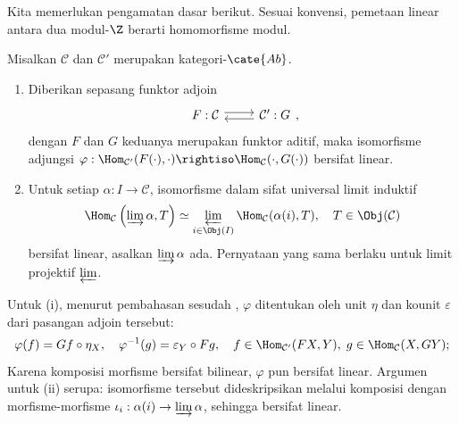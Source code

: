 Kita memerlukan pengamatan dasar berikut. Sesuai konvensi, pemetaan linear
antara dua modul-$\Z$ berarti homomorfisme modul.

\begin{proposisi}\label{prop:automatic-Ab-morphism}
	Misalkan $\mathcal{C}$ dan $\mathcal{C}'$ merupakan kategori-$\cate{Ab}$.
	\begin{enumerate}
		\item Diberikan sepasang funktor adjoin
		\[\begin{tikzcd}
			F: \mathcal{C} \arrow[shift left, r] & \mathcal{C}' \arrow[shift left, l] : G
		\end{tikzcd},\]
		dengan $F$ dan $G$ keduanya merupakan funktor aditif, maka isomorfisme
		adjungsi
		$\varphi: \Hom_{\mathcal{C}'}(F(\cdot), \cdot) \rightiso
		\Hom_{\mathcal{C}}(\cdot, G(\cdot))$ bersifat linear.
		\item Untuk setiap $\alpha: I \to \mathcal{C}$, isomorfisme dalam sifat
		universal limit induktif
		\[ \Hom_{\mathcal{C}}\left( \varinjlim \alpha, T \right) \simeq
		\varprojlim_{i \in \Obj(I)} \Hom_{\mathcal{C}}(\alpha(i), T),
		\quad T \in \Obj(\mathcal{C}) \]
		bersifat linear, asalkan $\varinjlim\alpha$ ada. Pernyataan yang
		sama berlaku untuk limit projektif $\varprojlim$.
	\end{enumerate}
\end{proposisi}

\begin{bukti}
	Untuk (i), menurut pembahasan sesudah \cite[Definisi 2.6.3]{Li1},
	$\varphi$ ditentukan oleh unit $\eta$ dan kounit $\varepsilon$ dari pasangan
	adjoin tersebut:
	\[ \varphi(f) = Gf \circ \eta_X, \quad
	\varphi^{-1}(g) = \varepsilon_Y \circ Fg, \quad
	f \in \Hom_{\mathcal{C}'}(FX, Y), \; g \in \Hom_{\mathcal{C}}(X, GY); \]
	Karena komposisi morfisme bersifat bilinear, $\varphi$ pun bersifat linear.
	Argumen untuk (ii) serupa: isomorfisme tersebut dideskripsikan melalui
	komposisi dengan morfisme-morfisme
	$\iota_i: \alpha(i) \to \varinjlim \alpha$, sehingga bersifat linear.
\end{bukti}

